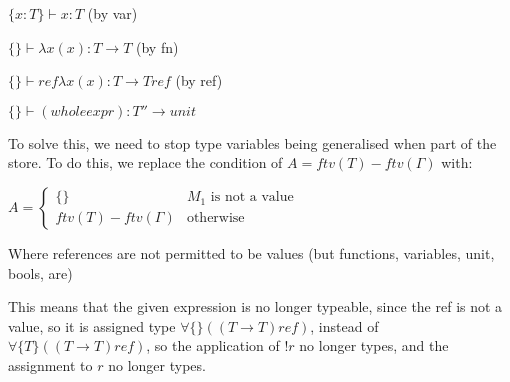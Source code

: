 \begin{enumerate}[label=(\alph*)]
    $\{x : T\} \vdash  x : T$ (by var)

    $\{\} \vdash \lambda x(x) : T \rightarrow T$ (by fn)

    $\{\} \vdash ref \lambda x(x) : T \rightarrow T ref$ (by ref)

    $\{\} \vdash (whole expr) : T'' \rightarrow unit$


    To solve this, we need to stop type variables being generalised when part of the store. To do this, we replace the condition of $A = ftv(T) - ftv(\Gamma)$ with:

      $A = \begin{cases}\{\} & M_1\text{ is not a value}\\ftv(T) - ftv(\Gamma) & \text{otherwise}\end{cases}$

      Where references are not permitted to be values (but functions, variables, unit, bools, are)

      This means that the given expression is no longer typeable, since the ref is not a value, so it is assigned type $\forall \{\}((T \rightarrow T) ref)$, instead of $\forall \{T\}((T \rightarrow T) ref)$, so the application of $!r$ no longer types, and the assignment to $r$ no longer types.



\end{enumerate}

